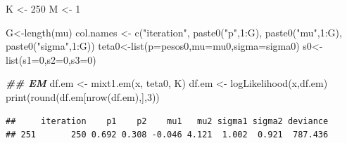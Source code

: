 \documentclass[
]{article}
\newenvironment{Shaded}{\begin{snugshade}}{\end{snugshade}}
\newcommand{\AttributeTok}[1]{\textcolor[rgb]{0.77,0.63,0.00}{#1}}
\newcommand{\DecValTok}[1]{\textcolor[rgb]{0.00,0.00,0.81}{#1}}
\newcommand{\DocumentationTok}[1]{\textcolor[rgb]{0.56,0.35,0.01}{\textbf{\textit{#1}}}}
\newcommand{\FunctionTok}[1]{\textcolor[rgb]{0.00,0.00,0.00}{#1}}
\newcommand{\NormalTok}[1]{#1}
\newcommand{\OtherTok}[1]{\textcolor[rgb]{0.56,0.35,0.01}{#1}}
\newcommand{\SpecialCharTok}[1]{\textcolor[rgb]{0.00,0.00,0.00}{#1}}
\newcommand{\StringTok}[1]{\textcolor[rgb]{0.31,0.60,0.02}{#1}}
\begin{document}
\begin{Shaded}
\begin{Highlighting}[]
\NormalTok{K }\OtherTok{\textless{}{-}} \DecValTok{250}
\NormalTok{M }\OtherTok{\textless{}{-}} \DecValTok{1}

\NormalTok{G}\OtherTok{\textless{}{-}}\FunctionTok{length}\NormalTok{(mu)}
\NormalTok{col.names }\OtherTok{\textless{}{-}} \FunctionTok{c}\NormalTok{(}\StringTok{"iteration"}\NormalTok{, }\FunctionTok{paste0}\NormalTok{(}\StringTok{"p"}\NormalTok{,}\DecValTok{1}\SpecialCharTok{:}\NormalTok{G), }\FunctionTok{paste0}\NormalTok{(}\StringTok{"mu"}\NormalTok{,}\DecValTok{1}\SpecialCharTok{:}\NormalTok{G), }\FunctionTok{paste0}\NormalTok{(}\StringTok{"sigma"}\NormalTok{,}\DecValTok{1}\SpecialCharTok{:}\NormalTok{G))}
\NormalTok{teta0}\OtherTok{\textless{}{-}}\FunctionTok{list}\NormalTok{(}\AttributeTok{p=}\NormalTok{pesos0,}\AttributeTok{mu=}\NormalTok{mu0,}\AttributeTok{sigma=}\NormalTok{sigma0)}
\NormalTok{s0}\OtherTok{\textless{}{-}}\FunctionTok{list}\NormalTok{(}\AttributeTok{s1=}\DecValTok{0}\NormalTok{,}\AttributeTok{s2=}\DecValTok{0}\NormalTok{,}\AttributeTok{s3=}\DecValTok{0}\NormalTok{)}

\DocumentationTok{\#\#  EM}
\NormalTok{df.em }\OtherTok{\textless{}{-}} \FunctionTok{mixt1.em}\NormalTok{(x, teta0, K)}
\NormalTok{df.em }\OtherTok{\textless{}{-}} \FunctionTok{logLikelihood}\NormalTok{(x,df.em)}
\FunctionTok{print}\NormalTok{(}\FunctionTok{round}\NormalTok{(df.em[}\FunctionTok{nrow}\NormalTok{(df.em),],}\DecValTok{3}\NormalTok{))}
\end{Highlighting}
\end{Shaded}

\begin{verbatim}
##     iteration    p1    p2    mu1   mu2 sigma1 sigma2 deviance
## 251       250 0.692 0.308 -0.046 4.121  1.002  0.921  787.436
\end{verbatim}
\end{document}
